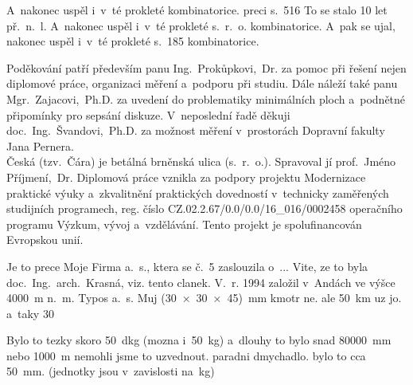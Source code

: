 
A~nakonec uspěl i~v~té prokleté kombinatorice.
preci s.~516
To se stalo 10 let př.~n.~l.
A~nakonec uspěl i~v~té prokleté s.~r.~o. kombinatorice. A~pak se ujal, nakonec uspěl i~v~té prokleté s.~185 kombinatorice.

\noindent Poděkování patří především panu Ing.~Prokůpkovi,~Dr. za pomoc při řešení nejen diplomové práce, organizaci měření a~podporu při studiu. Dále náleží také panu Mgr.~Zajacovi,~Ph.D. za uvedení do problematiky minimálních ploch a~podnětné připomínky pro sepsání diskuze. V~neposlední řadě děkuji doc.~Ing.~Švandovi,~Ph.D. za možnost měření v~prostorách Dopravní fakulty Jana Pernera.\\
Česká (tzv.~Čára) je betálná brněnská ulica (s.~r.~o.). Spravoval jí prof.~Jméno Příjmení,~Dr.
\noindent Diplomová práce vznikla za podpory projektu Modernizace praktické výuky a~zkvalitnění praktických dovedností v~technicky zaměřených studijních programech, reg. číslo CZ.02.2.67/0.0/0.0/16\_016/0002458 operačního programu Výzkum, vývoj a~vzdělávání. Tento projekt je spolufinancován Evropskou unií.

Je to prece Moje Firma a.~s., ktera se č.~5 zaslouzila o~... Vite, ze to byla doc.~Ing.~arch.~Krasná, viz. tento clanek.
V.~r. 1994 založil v~Andách ve výšce 4000~m n.~m. Typos a.~s.
Muj (30~×~30~×~45)~mm kmotr ne. ale 50~km uz jo. a~taky 30~%


Bylo to tezky skoro 50~dkg (mozna i~50~kg) a~dlouhy to bylo snad 80000~mm nebo 1000~m nemohli jsme to uzvednout.
paradni dmychadlo. bylo to cca 50~mm. (jednotky jsou v~zavislosti na~kg)
